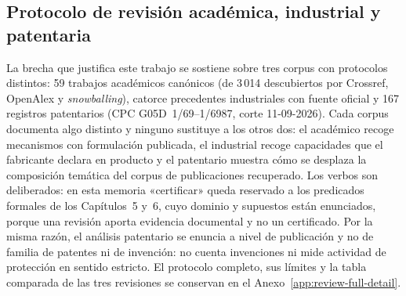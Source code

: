 \subsection{Protocolo de revisión académica, industrial y patentaria}
\label{subsec:method-review-protocol}

La brecha que justifica este trabajo se sostiene sobre tres corpus con
protocolos distintos: 59 trabajos académicos canónicos (de 3\,014 descubiertos
por Crossref, OpenAlex y \emph{snowballing}), catorce precedentes industriales
con fuente oficial y 167 registros patentarios (CPC G05D~1/69--1/6987, corte
11-09-2026). Cada corpus documenta algo distinto y ninguno sustituye a los
otros dos: el académico recoge mecanismos con formulación publicada, el
industrial recoge capacidades que el fabricante declara en producto y el
patentario muestra cómo se desplaza la composición temática del corpus de
publicaciones recuperado. Los verbos son deliberados: en esta memoria
«certificar» queda reservado a los predicados formales de los Capítulos~5 y~6,
cuyo dominio y supuestos están enunciados, porque una revisión aporta evidencia
documental y no un certificado. Por la misma razón, el análisis patentario se
enuncia a nivel de publicación y no de familia de patentes ni de invención: no
cuenta invenciones ni mide actividad de protección en sentido estricto. El
protocolo completo, sus límites y la tabla comparada de las tres revisiones se
conservan en el Anexo~\ref{app:review-full-detail}.
